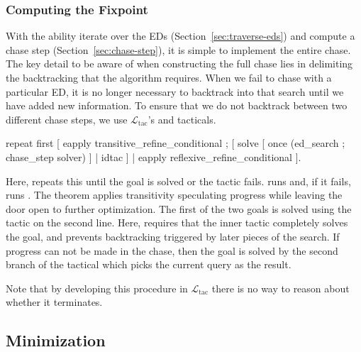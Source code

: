 \documentclass[preprint]{sigplanconf}
\newcommand{\ltac}[0]{\ensuremath{\mathcal{L}_{\mathrm{tac}}}}
\begin{document}
\subsubsection{Computing the Fixpoint}
With the ability iterate over the EDs (Section~\ref{sec:traverse-eds}) and compute a chase step (Section~\ref{sec:chase-step}), it is simple to implement the entire chase.
The key detail to be aware of when constructing the full chase lies in delimiting the backtracking that the algorithm requires.
When we fail to chase with a particular ED, it is no longer necessary to backtrack into that search until we have added new information.
To ensure that we do not backtrack between two different chase steps, we use \ltac's  and  tacticals.
\begin{coq}
repeat first [ eapply transitive_refine_conditional ;
                [ solve [ once (ed_search ; chase_step solver) ]
                | idtac ]
             | eapply reflexive_refine_conditional ].
\end{coq}
Here,  repeats this until the goal is solved or the tactic fails.
 runs  and, if it fails, runs .
The  theorem applies transitivity speculating progress while leaving the door open to further optimization.
The first of the two goals is solved using the tactic on the second line.
Here,  requires that the inner tactic completely solves the goal, and  prevents backtracking triggered by later pieces of the search.
If progress can not be made in the chase, then the goal is solved by the second branch of the  tactical which picks the current query as the result.

Note that by developing this procedure in \ltac{} there is no way to reason about whether it terminates.

\subsection{Minimization}
\label{sec:minimization}
\end{document}
